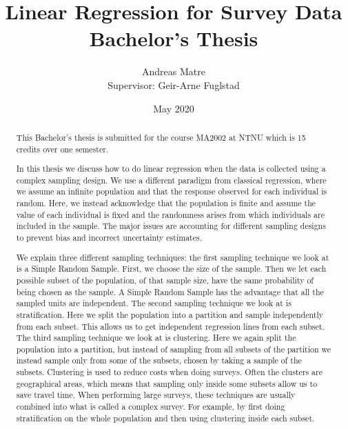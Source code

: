 \documentclass{article}
\title{\textbf{Linear Regression for Survey Data} \\
{\Large Bachelor's Thesis}}
\author{Andreas Matre \\
Supervisor: Geir-Arne Fuglstad}
\date{May 2020}
\begin{document}
\newtheorem{definition}{Definition}
\newtheorem{theorem}{Theorem}
\newtheorem{example}{Example}



\begin{abstract}
  This Bachelor's thesis is submitted for the course MA2002 at NTNU which is 15
  credits over one semester.

  In this thesis we discuss how to do linear regression when the data is
  collected using a complex sampling design. We use a different paradigm from
  classical regression, where we assume an infinite population and that the
  response observed for each individual is random. Here, we instead acknowledge
  that the population is finite and assume the value of each individual is fixed
  and the randomness arises from which individuals are included in the sample. The
  major issues are accounting for different sampling designs to prevent bias and
  incorrect uncertainty estimates.

  We explain three different sampling techniques: the first sampling technique
  we look at is a Simple Random Sample. First, we
  choose the size of the sample. Then we let each possible subset of
  the population, of that sample size, have the same probability of being chosen as
  the sample. A Simple Random Sample has the advantage that all the sampled
  units are independent.
  The second sampling technique we look at is stratification. Here we split the
  population into a partition and sample independently from each subset. This
  allows us to get independent regression lines from each subset. The third
  sampling technique we look at is clustering. Here we again split
  the population into a partition, but instead of sampling from all subsets of
  the partition we instead sample only from some of the subsets, chosen by
  taking a sample of the subsets. Clustering is used
  to reduce costs when doing surveys. Often the clusters are geographical areas,
  which means that sampling only inside some subsets allow us to save 
  travel time. When performing large surveys, these techniques are usually combined into what
  is called a complex survey. For example, by first doing stratification on the
  whole population and then using clustering inside each subset.


\end{abstract}
\end{document}
